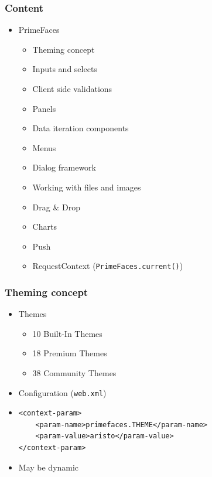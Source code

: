 \documentclass[10pt,xcolor=pdflatex]{beamer}
\begin{document}
\begin{frame}\frametitle{Content}
  \begin{itemize}
    \item PrimeFaces
      \begin{itemize}
    	\item Theming concept
		\item Inputs and selects
		\item Client side validations
		\item Panels
		\item Data iteration components
		\item Menus
		\item Dialog framework
		\item Working with files and images
		\item Drag \& Drop
		\item Charts
		\item Push
		\item RequestContext (\texttt{PrimeFaces.current()})
      \end{itemize}
  \end{itemize}
\end{frame}


\begin{frame}[containsverbatim]\frametitle{Theming concept}
  \begin{itemize}
    \item Themes
	  \begin{itemize}
		\item 10 Built-In Themes
		\item 18 Premium Themes
		\item 38 Community Themes
	  \end{itemize}
    \item Configuration (\texttt{web.xml})
    \item[] \begin{verbatim}
<context-param>
    <param-name>primefaces.THEME</param-name>
    <param-value>aristo</param-value>
</context-param>
\end{verbatim} 
    \item May be dynamic
  \end{itemize}
\end{frame}
\end{document}
